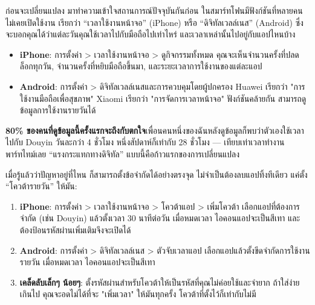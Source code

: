 


ก่อนจะเปลี่ยนแปลง มาทำความเข้าใจสถานการณ์ปัจจุบันกันก่อน ในสมาร์ทโฟนมีฟังก์ชันที่หลายคนไม่เคยเปิดใช้งาน เรียกว่า “เวลาใช้งานหน้าจอ” (iPhone) หรือ “ดิจิทัลเวลล์เนส” (Android) ซึ่งจะบอกคุณได้ว่าแต่ละวันคุณใช้เวลาไปกับมือถือไปเท่าไหร่ และเวลาเหล่านั้นไปอยู่กับแอปไหนบ้าง

\begin{itemize}
  \item \textbf{iPhone}: การตั้งค่า > เวลาใช้งานหน้าจอ > ดูกิจกรรมทั้งหมด คุณจะเห็นจำนวนครั้งที่ปลดล็อกทุกวัน, จำนวนครั้งที่หยิบมือถือขึ้นมา, และระยะเวลาการใช้งานของแต่ละแอป
  \item \textbf{Android}: การตั้งค่า > ดิจิทัลเวลล์เนสและการควบคุมโดยผู้ปกครอง Huawei เรียกว่า "การใช้งานมือถือเพื่อสุขภาพ" Xiaomi เรียกว่า "การจัดการเวลาหน้าจอ" ฟังก์ชันคล้ายกัน สามารถดูข้อมูลการใช้งานรายวันได้
\end{itemize}

\textbf{80\% ของคนที่ดูข้อมูลนี้ครั้งแรกจะถึงกับตกใจ}เพื่อนคนหนึ่งของฉันหลังดูข้อมูลก็พบว่าตัวเองใช้เวลาไปกับ Douyin วันละกว่า 4 ชั่วโมง หนึ่งสัปดาห์ก็เท่ากับ 28 ชั่วโมง — เทียบเท่าเวลาทำงานพาร์ทไทม์เลย “แรงกระแทกทางดิจิทัล” แบบนี้คือก้าวแรกของการเปลี่ยนแปลง


เมื่อรู้แล้วว่าปัญหาอยู่ที่ไหน ก็สามารถตั้งข้อจำกัดได้อย่างตรงจุด ไม่จำเป็นต้องลบแอปทิ้งทีเดียว แค่ตั้ง “โควต้ารายวัน” ให้มัน:

\begin{enumerate}
  \item \textbf{iPhone}: การตั้งค่า > เวลาใช้งานหน้าจอ > โควต้าแอป > เพิ่มโควต้า เลือกแอปที่ต้องการจำกัด (เช่น Douyin) แล้วตั้งเวลา 30 นาทีต่อวัน เมื่อหมดเวลา ไอคอนแอปจะเป็นสีเทา และต้องป้อนรหัสผ่านเพิ่มเติมจึงจะเปิดได้
  \item \textbf{Android}: การตั้งค่า > ดิจิทัลเวลล์เนส > ตัวจับเวลาแอป เลือกแอปแล้วตั้งขีดจำกัดการใช้งานรายวัน เมื่อหมดเวลา ไอคอนแอปจะเป็นสีเทา
  \item \textbf{เคล็ดลับเล็กๆ น้อยๆ}: ตั้งรหัสผ่านสำหรับโควต้าให้เป็นรหัสที่คุณไม่ค่อยใช้และจำยาก ถ้าใส่ง่ายเกินไป คุณจะอดไม่ได้ที่จะ "เพิ่มเวลา" ให้มันทุกครั้ง โควต้าที่ตั้งไว้ก็เท่ากับไม่มี
\end{enumerate}

